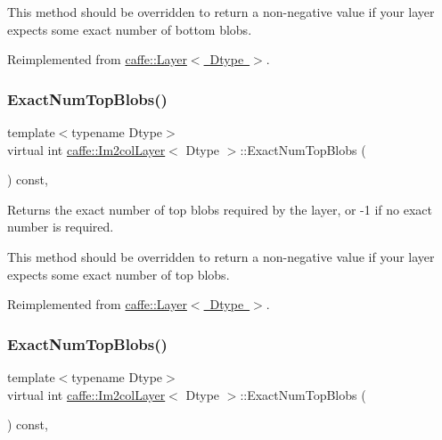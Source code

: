 This method should be overridden to return a non-\/negative value if your layer expects some exact number of bottom blobs. 

Reimplemented from \mbox{\hyperlink{classcaffe_1_1_layer_a8e5ee0494d85f5f55fc4396537cbc60f}{caffe\+::\+Layer$<$ Dtype $>$}}.

\mbox{\label{classcaffe_1_1_im2col_layer_ab2cf1f7dd41b801ed32471ec492d423c}} 
\subsubsection{\texorpdfstring{Exact\+Num\+Top\+Blobs()}{ExactNumTopBlobs()}\hspace{0.1cm}{\footnotesize\ttfamily [1/2]}}
{\footnotesize\ttfamily template$<$typename Dtype$>$ \\
virtual int \mbox{\hyperlink{classcaffe_1_1_im2col_layer}{caffe\+::\+Im2col\+Layer}}$<$ Dtype $>$\+::Exact\+Num\+Top\+Blobs (\begin{DoxyParamCaption}{ }\end{DoxyParamCaption}) const\hspace{0.3cm}{\ttfamily [inline]}, {\ttfamily [virtual]}}



Returns the exact number of top blobs required by the layer, or -\/1 if no exact number is required. 

This method should be overridden to return a non-\/negative value if your layer expects some exact number of top blobs. 

Reimplemented from \mbox{\hyperlink{classcaffe_1_1_layer_a64e2ca72c719e4b2f1f9216ccfb0d37f}{caffe\+::\+Layer$<$ Dtype $>$}}.

\mbox{\label{classcaffe_1_1_im2col_layer_ab2cf1f7dd41b801ed32471ec492d423c}} 
\subsubsection{\texorpdfstring{Exact\+Num\+Top\+Blobs()}{ExactNumTopBlobs()}\hspace{0.1cm}{\footnotesize\ttfamily [2/2]}}
{\footnotesize\ttfamily template$<$typename Dtype$>$ \\
virtual int \mbox{\hyperlink{classcaffe_1_1_im2col_layer}{caffe\+::\+Im2col\+Layer}}$<$ Dtype $>$\+::Exact\+Num\+Top\+Blobs (\begin{DoxyParamCaption}{ }\end{DoxyParamCaption}) const\hspace{0.3cm}{\ttfamily [inline]}, {\ttfamily [virtual]}}



